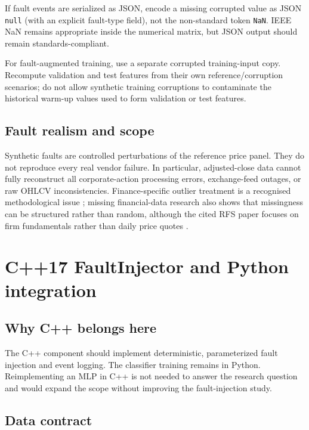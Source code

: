 \documentclass[11pt,a4paper]{article}
\begin{document}
If fault events are serialized as JSON, encode a missing corrupted value as JSON \texttt{null} (with an explicit fault-type field), not the non-standard token \texttt{NaN}. IEEE NaN remains appropriate inside the numerical matrix, but JSON output should remain standards-compliant.

For fault-augmented training, use a separate corrupted training-input copy. Recompute validation and test features from their own reference/corruption scenarios; do not allow synthetic training corruptions to contaminate the historical warm-up values used to form validation or test features.

\subsection{Fault realism and scope}

Synthetic faults are controlled perturbations of the reference price panel. They do not reproduce every real vendor failure. In particular, adjusted-close data cannot fully reconstruct all corporate-action processing errors, exchange-feed outages, or raw OHLCV inconsistencies. Finance-specific outlier treatment is a recognised methodological issue \cite{Adams2019}; missing financial-data research also shows that missingness can be structured rather than random, although the cited RFS paper focuses on firm fundamentals rather than daily price quotes \cite{Bryzgalova2025}.

\section{C++17 FaultInjector and Python integration}
\label{sec:cpp}

\subsection{Why C++ belongs here}

The C++ component should implement deterministic, parameterized fault injection and event logging. The classifier training remains in Python. Reimplementing an MLP in C++ is not needed to answer the research question and would expand the scope without improving the fault-injection study.

\subsection{Data contract}
\end{document}

